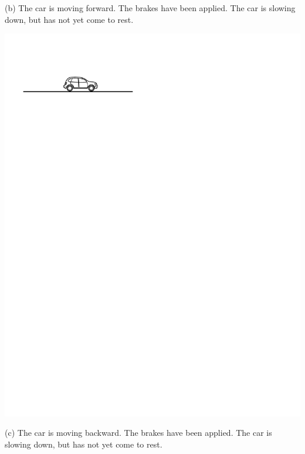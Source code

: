 (b) The car is moving forward. The brakes have been applied. The car is slowing
down, but has not yet come to rest.

\vspace{0.3cm}
{\par\centering \includegraphics{slowing/car_on_ground.pdf} \par}
\vspace{0.3cm}

(c) The car is moving backward. The brakes have been applied. The car is slowing down, but has not yet come to rest.

